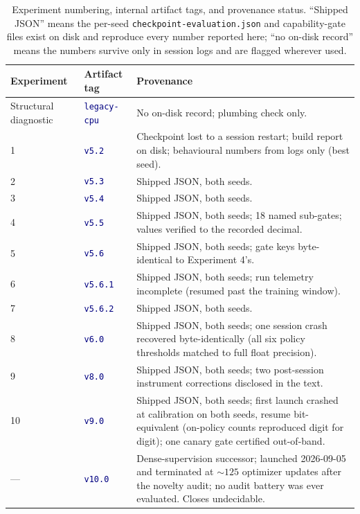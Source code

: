 \documentclass[10pt,a4paper]{article}
\newcommand{\studytag}[1]{\colorbox{navy!10}{\textcolor{navy}{\footnotesize\texttt{#1}}}}
\begin{document}
\begin{table}[htbp]
\caption{Experiment numbering, internal artifact tags, and provenance status.
``Shipped JSON'' means the per-seed \texttt{checkpoint-evaluation.json} and
capability-gate files exist on disk and reproduce every number reported here;
``no on-disk record'' means the numbers survive only in session logs and are
flagged wherever used.}
\label{tab:provenance}
\centering\footnotesize
\begin{tabularx}{\textwidth}{@{}llX@{}}
\toprule
Experiment & Artifact tag & Provenance \\
\midrule
Structural diagnostic & \studytag{legacy-cpu} & No on-disk record; plumbing check only. \\
1 & \studytag{v5.2} & Checkpoint lost to a session restart; build report on disk; behavioural numbers from logs only (best seed). \\
2 & \studytag{v5.3} & Shipped JSON, both seeds. \\
3 & \studytag{v5.4} & Shipped JSON, both seeds. \\
4 & \studytag{v5.5} & Shipped JSON, both seeds; 18 named sub-gates; values verified to the recorded decimal. \\
5 & \studytag{v5.6} & Shipped JSON, both seeds; gate keys byte-identical to Experiment 4's. \\
6 & \studytag{v5.6.1} & Shipped JSON, both seeds; run telemetry incomplete (resumed past the training window). \\
7 & \studytag{v5.6.2} & Shipped JSON, both seeds. \\
8 & \studytag{v6.0} & Shipped JSON, both seeds; one session crash recovered byte-identically (all six policy thresholds matched to full float precision). \\
9 & \studytag{v8.0} & Shipped JSON, both seeds; two post-session instrument corrections disclosed in the text. \\
10 & \studytag{v9.0} & Shipped JSON, both seeds; first launch crashed at calibration on both seeds, resume bit-equivalent (on-policy counts reproduced digit for digit); one canary gate certified out-of-band. \\
--- & \studytag{v10.0} & Dense-supervision successor; launched 2026-09-05 and terminated at ${\sim}125$ optimizer updates after the novelty audit; no audit battery was ever evaluated. Closes undecidable. \\
\bottomrule
\end{tabularx}
\end{table}
\end{document}
